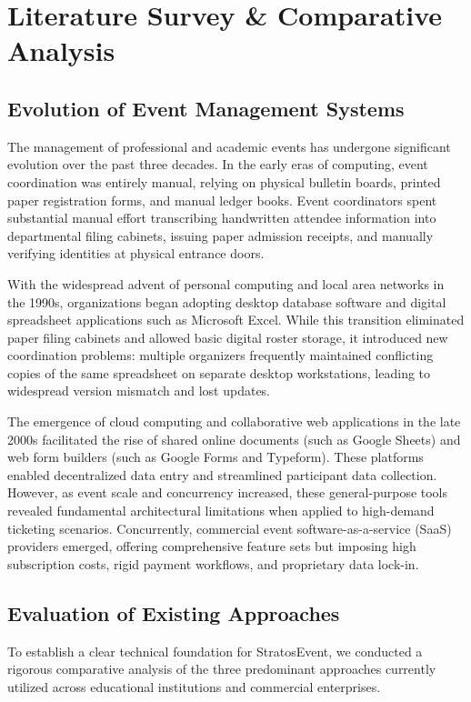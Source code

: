 \documentclass[11pt,a4paper]{report}
\begin{document}
\chapter{Literature Survey \& Comparative Analysis}

\section{Evolution of Event Management Systems}
\justifying
The management of professional and academic events has undergone significant evolution over the past three decades. In the early eras of computing, event coordination was entirely manual, relying on physical bulletin boards, printed paper registration forms, and manual ledger books. Event coordinators spent substantial manual effort transcribing handwritten attendee information into departmental filing cabinets, issuing paper admission receipts, and manually verifying identities at physical entrance doors.

With the widespread advent of personal computing and local area networks in the 1990s, organizations began adopting desktop database software and digital spreadsheet applications such as Microsoft Excel. While this transition eliminated paper filing cabinets and allowed basic digital roster storage, it introduced new coordination problems: multiple organizers frequently maintained conflicting copies of the same spreadsheet on separate desktop workstations, leading to widespread version mismatch and lost updates.

The emergence of cloud computing and collaborative web applications in the late 2000s facilitated the rise of shared online documents (such as Google Sheets) and web form builders (such as Google Forms and Typeform). These platforms enabled decentralized data entry and streamlined participant data collection. However, as event scale and concurrency increased, these general-purpose tools revealed fundamental architectural limitations when applied to high-demand ticketing scenarios. Concurrently, commercial event software-as-a-service (SaaS) providers emerged, offering comprehensive feature sets but imposing high subscription costs, rigid payment workflows, and proprietary data lock-in.

\section{Evaluation of Existing Approaches}
\justifying
To establish a clear technical foundation for StratosEvent, we conducted a rigorous comparative analysis of the three predominant approaches currently utilized across educational institutions and commercial enterprises.
\end{document}
